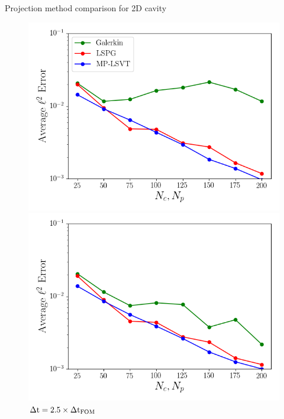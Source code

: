 \documentclass[]{beamer}
\begin{document}
\begin{frame}[noframenumbering]{Projection method comparison for 2D cavity}
	\begin{figure}
		\begin{minipage}{0.35\linewidth}
			\includegraphics[width=0.99\linewidth]{Images/experiments/2d_cavity/backup/unsampled_dt1e-6_Average_errorRaw.png}
			\caption*{\scriptsize{$\dt = \dtFOM$}}
		\end{minipage}
		\begin{minipage}{0.35\linewidth}
			\includegraphics[width=0.99\linewidth]{Images/experiments/2d_cavity/backup/unsampled_dt2p5e-6_Average_errorRaw.png}
			\caption*{\scriptsize{$\Delta \text{t} = 2.5 \times \Delta \text{t}_{\text{FOM}}$}}
		\end{minipage}
	

\end{figure}
\end{frame}
\end{document}

